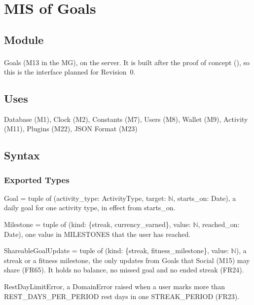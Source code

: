 \documentclass[12pt, titlepage]{article}
\begin{document}

\section{MIS of Goals} \label{MisGoals}

\begingroup\raggedright
\subsection{Module}

Goals (M13 in the MG), on the server. It is built after the proof of concept
(\textsuperscript{\dag}), so this is the interface planned for Revision~0.

\subsection{Uses}

Database (M1), Clock (M2), Constants (M7), Users (M8), Wallet (M9), Activity
(M11), Plugins (M22), JSON Format (M23)

\subsection{Syntax}

\subsubsection{Exported Types}

\noindent Goal = tuple of (activity\_type: ActivityType, target: $\mathbb{N}$,
starts\_on: Date), a daily goal for one activity type, in effect from starts\_on.

\medskip
\noindent Milestone = tuple of (kind: \{streak, currency\_earned\}, value:
$\mathbb{N}$, reached\_on: Date), one value in MILESTONES that the user has
reached.

\medskip
\noindent ShareableGoalUpdate = tuple of (kind: \{streak,
fitness\_milestone\}, value: $\mathbb{N}$), a streak or a fitness milestone,
the only updates from Goals that Social (M15) may share (FR65). It holds no
balance, no missed goal and no ended streak (FR24).

\medskip
\noindent RestDayLimitError, a DomainError raised when a user marks more than
REST\_DAYS\_PER\_PERIOD rest days in one STREAK\_PERIOD (FR23).
\end{document}
